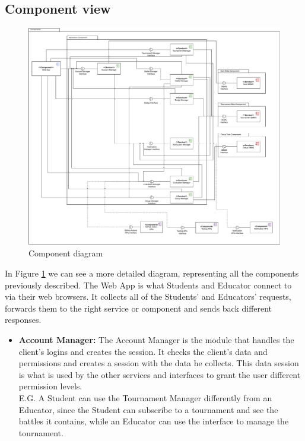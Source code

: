 \documentclass{article}
\begin{document}
{\subsection{Component view}
\begin{figure}[H]
    \centering
    \hspace*{-4cm}\includegraphics[scale=0.5]{images/ComponentView.pdf}
    \caption{Component diagram}
    \label{fig:componentView}
\end{figure}
In Figure \ref{fig:componentView} we can see a more detailed diagram, representing all the 
components previously described. The Web App is what Students and Educator connect to via their 
web browsers. It collects all of the Students' and Educators' requests, forwards them to the 
right service or component and sends back different responses.
\begin{itemize}
\item \textbf{Account Manager:} The Account Manager is the module that handles the client's 
logins and creates the session. It checks the client's data and permissions and creates a session 
with the data he collects. This data session is what is used by the other services and
interfaces to grant the user different permission levels. \\
E.G. A Student can use the Tournament Manager differently from an Educator, since the Student 
can subscribe to a tournament and see the battles it contains, while an Educator can use the 
interface to manage the tournament.\\

\end{itemize}}
\end{document}
